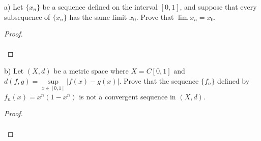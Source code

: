 a) Let $\{x_n\}$ be a sequence defined on the interval $[0, 1]$, and suppose that every \newline
   subsequence of $\{x_n\}$ has the same limit $x_0$. Prove that $\lim{x_n} = x_0$.

\begin{proof}\renewcommand{\qedsymbol}{}\ \\\\
\end{proof}

\pagebreak

b) Let $(X, d)$ be a metric space where $X = C[0, 1]$ and $d(f, g) = \sup\limits_{x \in [0, 1]}{|f(x) - g(x)}|$. Prove
   that the sequence $\{f_n\}$ defined by $f_n(x) = x^n(1 - x^n)$ is not a convergent sequence in $(X, d)$.

\begin{proof}\renewcommand{\qedsymbol}{}\ \\\\
\end{proof}

